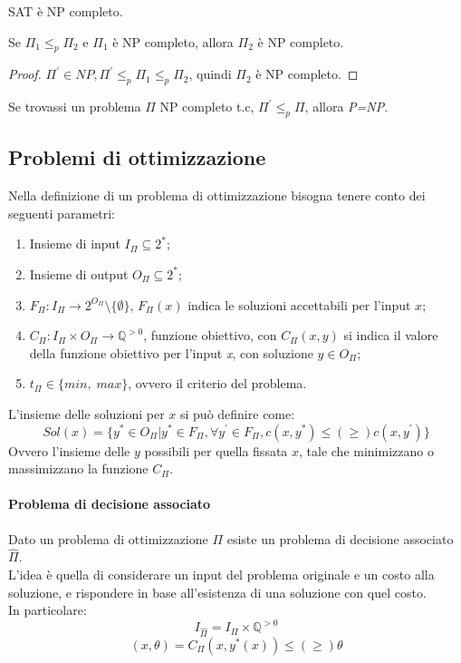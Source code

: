 \begin{theorem}
    SAT è NP completo.
\end{theorem}
\begin{corollary}
    Se $\Pi_1 \leqslant _p \Pi_2$ e $\Pi_1$ è NP completo, allora $\Pi_2$ è NP completo.
\end{corollary}
\begin{proof}
    $\Pi^\prime \in NP, \Pi^\prime \leqslant _p \Pi_1 \leqslant _p \Pi_2$, quindi $\Pi_2$ è NP completo.
\end{proof}
\begin{remark}
    Se trovassi un problema $\Pi$ NP completo t.c, $\Pi^\prime \leqslant _p \Pi$, 
    allora \emph{P=NP}.
\end{remark}

\subsection{Problemi di ottimizzazione}
Nella definizione di un problema di ottimizzazione bisogna tenere conto dei 
seguenti parametri:
\begin{enumerate}
    \item Insieme di input $I_\Pi \subseteq 2^*$;
    \item Insieme di output $O_\Pi \subseteq 2^*$;
    \item $F_\Pi : I_\Pi \rightarrow 2^{O_\Pi} \setminus \{\emptyset\}$, $F_\Pi(x)$ indica 
    le soluzioni accettabili per l'input $x$;
    \item $C_\Pi : I_\Pi \times O_\Pi \rightarrow \mathbb{Q}^{>0}$, funzione obiettivo, 
    con $C_\Pi(x,y)$ si indica il valore della funzione obiettivo per l'input \emph{x}, con soluzione $y \in O_\Pi$;
    \item $t_\Pi \in \{min, \;max\}$, ovvero il criterio del problema.
\end{enumerate}
L'insieme delle soluzioni per $x$ si può definire come:
$$Sol(x) = \{y^* \in O_\Pi | y^* \in F_\Pi, \forall y^\prime \in F_\Pi, c(x, y^*) \leqslant (\geq ) c(x, y^\prime)\}$$
Ovvero l'insieme delle $y$ possibili per quella fissata $x$, tale che minimizzano o massimizzano la funzione $C_\Pi$.

\paragraph{Problema di decisione associato}
Dato un problema di ottimizzazione $\Pi$ esiste un problema di decisione associato $\hat{\Pi}$.
\\L'idea è quella di considerare un input del problema originale e un costo alla soluzione, e rispondere
in base all'esistenza di una soluzione con quel costo.\\
In particolare: $$I_{\hat{\Pi}} = I_\Pi \times \mathbb{Q}^{>0}$$ 
$$(x, \theta) = C_\Pi(x, y^*(x)) \leqslant (\geq ) \theta$$

